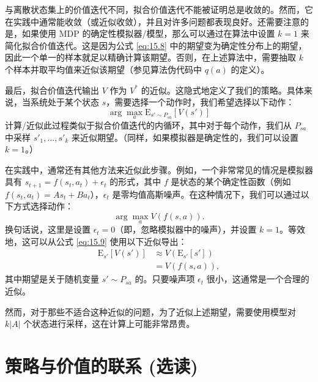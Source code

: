 与离散状态集上的价值迭代不同，拟合价值迭代不能被证明总是收敛的。然而，它在实践中通常能收敛（或近似收敛），并且对许多问题都表现良好。还需要注意的是，如果使用 MDP 的确定性模拟器/模型，那么可以通过在算法中设置 $k=1$ 来简化拟合价值迭代。这是因为公式 \eqref{eq:15.8} 中的期望变为确定性分布上的期望，因此一个单一的样本就足以精确计算该期望。否则，在上述算法中，需要抽取 $k$ 个样本并取平均值来近似该期望（参见算法伪代码中 $q(a)$ 的定义）。

最后，拟合价值迭代输出 $V$ 作为 $V^*$ 的近似。这隐式地定义了我们的策略。具体来说，当系统处于某个状态 $s$，需要选择一个动作时，我们希望选择以下动作：
\begin{equation}
    \arg \max_a \mathrm{E}_{s' \sim P_{sa}} [V(s')] \label{eq:15.9}
\end{equation}
计算/近似此过程类似于拟合价值迭代的内循环，其中对于每个动作，我们从 $P_{sa}$ 中采样 $s'_1, \dots, s'_k$ 来近似期望。（同样，如果模拟器是确定性的，我们可以设置 $k=1$。）

在实践中，通常还有其他方法来近似此步骤。例如，一个非常常见的情况是模拟器具有 $s_{t+1} = f(s_t, a_t) + \epsilon_t$ 的形式，其中 $f$ 是状态的某个确定性函数（例如 $f(s_t, a_t) = As_t + Ba_t$），$\epsilon_t$ 是零均值高斯噪声。在这种情况下，我们可以通过以下方式选择动作：
\[
    \arg \max_a V(f(s, a)).
\]
换句话说，这里是设置 $\epsilon_t = 0$（即，忽略模拟器中的噪声），并设置 $k=1$。等效地，这可以从公式 \eqref{eq:15.9} 使用以下近似导出：
\begin{align}
    \mathrm{E}_{s'}[V(s')] &\approx V(\mathrm{E}_{s'}[s']) \label{eq:15.10} \\
    &= V(f(s, a)), \label{eq:15.11}
\end{align}
其中期望是关于随机变量 $s' \sim P_{sa}$ 的。只要噪声项 $\epsilon_t$ 很小，这通常是一个合理的近似。

然而，对于那些不适合这种近似的问题，为了近似上述期望，需要使用模型对 $k|A|$ 个状态进行采样，这在计算上可能非常昂贵。

\section{策略与价值的联系 (选读)}\label{sec:15.5}

